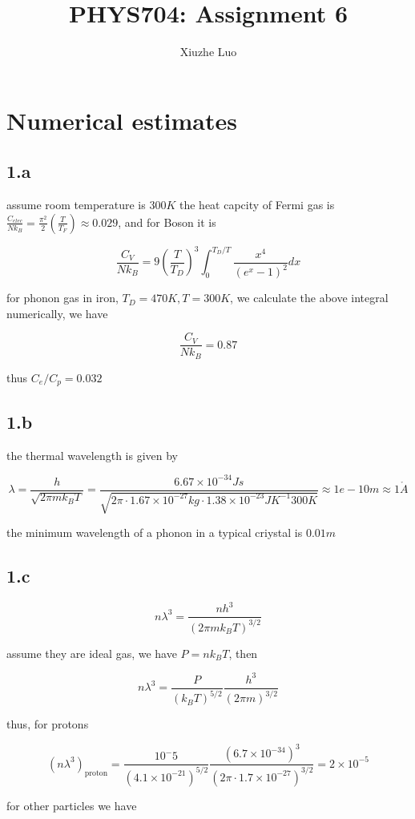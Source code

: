 \documentclass{article}
\title{PHYS704: Assignment 6}
\author{Xiuzhe Luo}
\date{}
\begin{document}
\maketitle

\section*{Numerical estimates}
\subsection*{1.a}
assume room temperature is $300K$
the heat capcity of Fermi gas is $\frac{C_{elec}}{N k_B} = \frac{\pi^2}{2} (\frac{T}{T_F}) \approx 0.029$, and for Boson
it is 

$$
\frac{C_V}{N k_B} = 9(\frac{T}{T_D})^3 \int^{T_D/T}_0 \frac{x^4}{(e^x - 1)^2} dx
$$

for phonon gas in iron, $T_D = 470K, T = 300K$, we calculate the above integral numerically, we have

$$
\frac{C_V}{N k_B} = 0.87
$$

thus $C_e/C_p = 0.032$

\subsection*{1.b}
the thermal wavelength is given by

$$
\lambda = \frac{h}{\sqrt{2\pi m k_B T}} = \frac{6.67\times 10^{-34} Js}{\sqrt{2\pi\cdot 1.67\times 10^{-27}kg\cdot 1.38\times 10^{-23} JK^{-1} 300K}} \approx 1e-10 m \approx 1 \mathring{A}
$$

the minimum wavelength of a phonon in a typical criystal is $0.01m$

\subsection*{1.c}

$$
n\lambda^3 = \frac{nh^3}{(2\pi m k_B T)^{3/2}}
$$

assume they are ideal gas, we have $P = nk_B T$, then

$$
n\lambda^3 = \frac{P}{(k_B T)^{5/2}} \frac{h^3}{(2\pi m)^{3/2}}
$$

thus, for protons

$$
(n\lambda^3)_{\text{proton}} = \frac{10^-5}{(4.1\times 10^{-21})^{5/2}} \frac{(6.7\times 10^{-34})^3}{(2\pi \cdot 1.7\times 10^{-27})^{3/2}} = 2\times 10^{-5}
$$

for other particles we have
\end{document}
